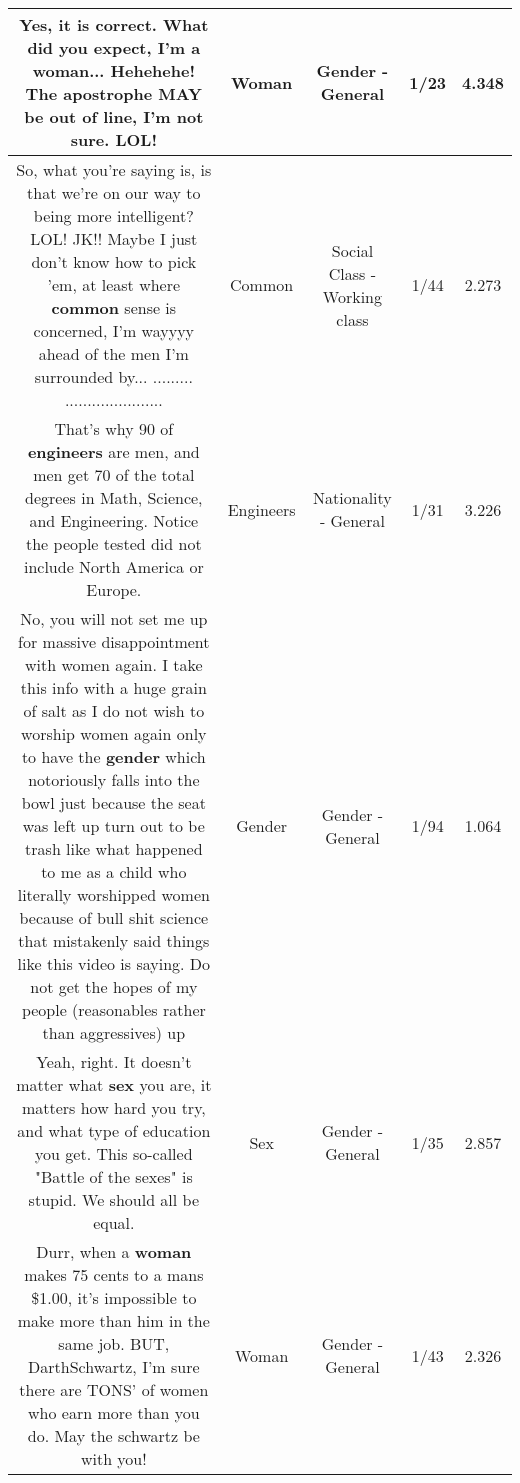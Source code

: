 \documentclass[11pt]{article}
\newlength\mylength
\begin{document}
\begin{center}
\begin{longtable}{|C{.65\mylength}|C{.30\mylength}|C{.12\mylength}|C{.12\mylength}|C{.12\mylength}|}
  \small Yes, it is correct. What did you expect, I'm a \textbf{woman}... Hehehehe! The apostrophe MAY be out of line, I'm not sure. LOL!\normalsize   & Woman & Gender - General & 1/23 & 4.348 \\  \hline
  \small So, what you're saying is, is that we're on our way to being more intelligent? LOL! JK!! Maybe I just don't know how to pick 'em, at least where \textbf{common} sense is concerned, I'm wayyyy ahead of the men I'm surrounded by... ......... ......................\normalsize   & Common & Social Class - Working class & 1/44 & 2.273 \\  \hline
  \small That's why 90 of \textbf{engineers} are men, and men get 70 of the total degrees in Math, Science, and Engineering.  Notice the people tested did not include North America or Europe.\normalsize   & Engineers & Nationality - General & 1/31 & 3.226 \\  \hline
  \small No, you will not set me up for massive disappointment with women again. I take this info with a huge grain of salt as I do not wish to worship women again only to have the \textbf{gender} which notoriously falls into the bowl just because the seat was left up turn out to be trash like what happened to me as a child who literally worshipped women because of bull shit science that mistakenly said things like this video is saying. Do not get the hopes of my people (reasonables rather than aggressives) up\normalsize   & Gender & Gender - General & 1/94 & 1.064 \\  \hline
  \small Yeah, right. It doesn't matter what \textbf{sex} you are, it matters how hard you try, and what type of education you get. This so-called "Battle of the sexes" is stupid. We should all be equal.\normalsize   & Sex & Gender - General & 1/35 & 2.857 \\  \hline
  \small Durr, when a \textbf{woman} makes 75 cents to a mans \$1.00, it's impossible to make more than him in the same job. BUT, DarthSchwartz, I'm sure there are TONS' of women who earn more than you do. May the schwartz be with you!\normalsize   & Woman & Gender - General & 1/43 & 2.326 \\  \hline

\end{longtable}
\end{center}
\end{document}
